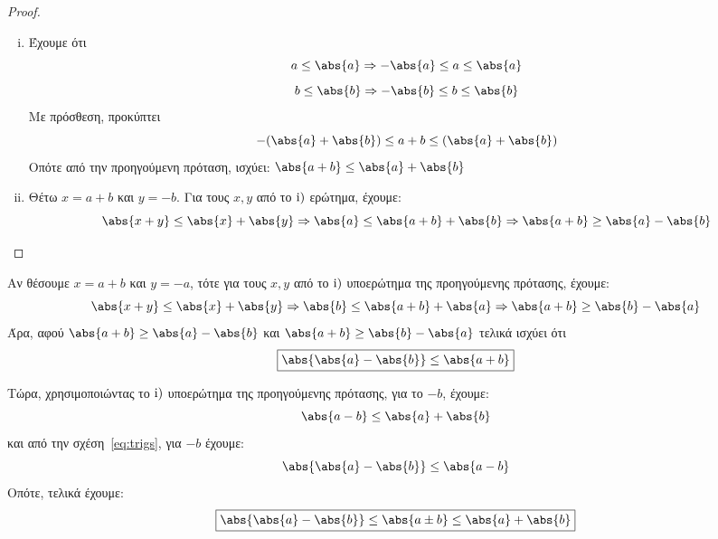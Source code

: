 \documentclass[main.tex]{subfiles}
\begin{document}

\begin{proof}
\item {}
  \begin{enumerate}[i)]
    \item Έχουμε ότι 
      \[ 
        a \leq \abs{a} \Rightarrow - \abs{a} \leq a \leq \abs{a}
      \] 
      \[
        b \leq \abs{b} \Rightarrow - \abs{b} \leq b \leq \abs{b} 
      \] 
      Με πρόσθεση, προκύπτει
      \[
        - (\abs{a} + \abs{b} ) \leq a + b \leq ( \abs{a} + \abs{b}) 
      \] 
      Οπότε από την προηγούμενη πρόταση, ισχύει:
      $ \abs{a+b} \leq \abs{a} + \abs{b} $
    \item Θέτω $ x = a+b $ και $ y = -b $. Για τους $ x,y $ από το $ \rm{i}) $ 
      ερώτημα, έχουμε:
      \[
        \abs{x+y} \leq \abs{x} + \abs{y} \Rightarrow \abs{a} \leq 
        \abs{a+b} + \abs{b} \Rightarrow \abs{a+b} \geq \abs{a} - \abs{b}
      \] 
  \end{enumerate} 
\end{proof} 

\begin{rem}
  Αν θέσουμε $ x = a+b $ και $ y = -a $, τότε για τους $ x,y $ από το $ \rm{i)} $ 
  υποερώτημα της προηγούμενης πρότασης, έχουμε:
  \[
    \abs{x+y} \leq \abs{x} + \abs{y} \Rightarrow \abs{b} \leq 
    \abs{a+b} + \abs{a} \Rightarrow \abs{a+b} \geq \abs{b} - \abs{a} 
  \] 
  Άρα, αφού $ \abs{a+b} \geq \abs{a} - \abs{b} $ και 
  $ \abs{a+b} \geq \abs{b} - \abs{a} $ τελικά ισχύει ότι
  \begin{equation}\label{eq:trigs} 
    \boxed{\abs{\abs{a} - \abs{b}} \leq \abs{a+b}}
  \end{equation}

  Τώρα, χρησιμοποιώντας το $ \rm{i)} $ υποερώτημα της προηγούμενης πρότασης, για το 
  $ -b $, έχουμε:
  \[
    \abs{a-b} \leq \abs{a} + \abs{b} 
  \] 
  και από την σχέση~\eqref{eq:trigs}, για $-b$ έχουμε:
  \[
    \abs{\abs{a} - \abs{b}} \leq \abs{a-b} 
  \]
  Οπότε, τελικά έχουμε:
  \[
    \boxed{\abs{\abs{a} - \abs{b}} \leq \abs{a \pm b} \leq \abs{a} + \abs{b}  }
  \]
\end{rem}
\end{document}
